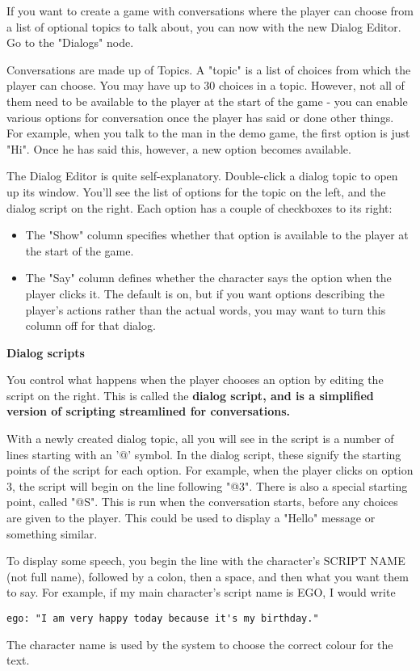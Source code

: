 If you want to create a game with conversations where the player can choose
from a list of optional topics to talk about, you can now with the new Dialog
Editor. Go to the "Dialogs" node.

Conversations are made up of Topics. A "topic" is a list of choices from
which the player can choose. You may have up to 30 choices in a topic.
However, not all of them need to be available to the player at the start of the
game - you can enable various options for conversation once the player has
said or done other things. For example, when you talk to the man in the demo
game, the first option is just "Hi". Once he has said this, however, a new
option becomes available.

The Dialog Editor is quite self-explanatory. Double-click a dialog topic
to open up its window. You'll see the list of options for the topic on
the left, and the dialog script on the right. Each option
has a couple of checkboxes to its right:
\begin{itemize}\itemsep=0pt
\item The "Show" column specifies whether that option is available to the player
at the start of the game.
\item The "Say" column defines whether the character
says the option when the player clicks it. The default is on, but if you
want options describing the player's actions rather than the actual words,
you may want to turn this column off for that dialog.
\end{itemize}
\bf{Dialog scripts}

You control what happens when the player chooses an option by editing
the script on the right. This is called the \bf{dialog script}, and is a
simplified version of scripting streamlined for conversations.

With a newly created dialog topic, all you will see in the script is a number
of lines starting with an '@' symbol. In the dialog script, these signify the starting points of
the script for each option. For example, when the player clicks on option 3,
the script will begin on the line following "@3". There is also a special
starting point, called "@S". This is run when the conversation starts, before
any choices are given to the player. This could be used to display a "Hello"
message or something similar.

To display some speech, you begin the line with the character's SCRIPT NAME
(not full name), followed by a colon, then a space, and then what you want
them to say. For example, if my main character's script name is EGO, I would
write
\begin{verbatim}
ego: "I am very happy today because it's my birthday."
\end{verbatim}
The character name is used by the system to choose the correct colour for
the text.


